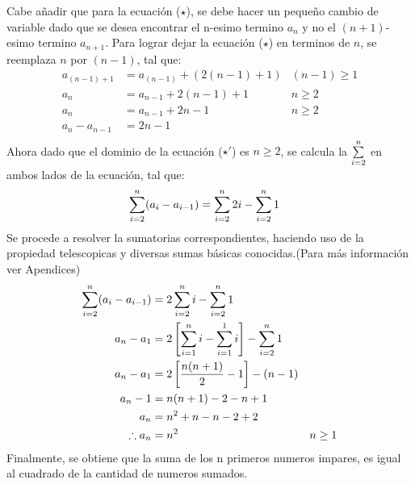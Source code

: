 \begin{solution}
  Cabe añadir que para la ecuación ($\star$), se debe hacer un pequeño cambio de variable dado que se desea encontrar el n-esimo termino $a_n$ y no el $(n+1)$-esimo termino $a_{n+1}$. Para lograr dejar la ecuación ($\star$) en terminos de $n$, se reemplaza $n$ por $(n-1)$, tal que:
  \begin{align*}
      a_{(n-1)+1} &=a_{(n-1)} + (2(n-1) + 1) & (n-1)\ge 1 \\
      a_n &=a_{n-1} + 2(n-1) + 1 & n\ge 2 \\
      a_n &= a_{n-1} + 2n - 1 & n\ge 2 \\
      a_n - a_{n-1} &= 2n - 1 \tag{$\star '$}\\
  \end{align*}
  \newpage
  Ahora dado que el dominio de la ecuación ($\star '$) es $n \ge 2$, se calcula la $\sum\limits_{i=2}^{n}$ en ambos lados de la ecuación, tal que:
  \begin{align*}
      \sum\limits_{i=2}^{n} (a_i - a_{i-1})  &= \sum\limits_{i=2}^{n}2i - \sum\limits_{i=2}^{n}1
  \end{align*}
  Se procede a resolver la sumatorias correspondientes, haciendo uso de la propiedad telescopicas y diversas sumas básicas conocidas.(Para más información ver Apendices)
  \begin{align*}
      \sum\limits_{i=2}^{n} (a_i - a_{i-1})  &= 2\sum\limits_{i=2}^{n}i - \sum\limits_{i=2}^{n}1 \\
      a_n - a_1 &= 2 \left[ \sum\limits_{i=1}^{n}i - \sum\limits_{i=1}^{1}i   \right] - \sum\limits_{i=2}^{n}1\\
      a_n - a_1 &= 2 \left[ \frac{n(n+1)}{2}-1\right] - (n- 1)\\
      a_n - 1 &= n(n+1) -2 -n + 1\\
      a_n &= n^2 +n -n -2 +2 \\
      \therefore a_n &= n^2 & n\ge 1
  \end{align*}
  Finalmente, se obtiene que la suma de los n primeros numeros impares, es igual al cuadrado de la cantidad de numeros sumados.
\end{solution}
